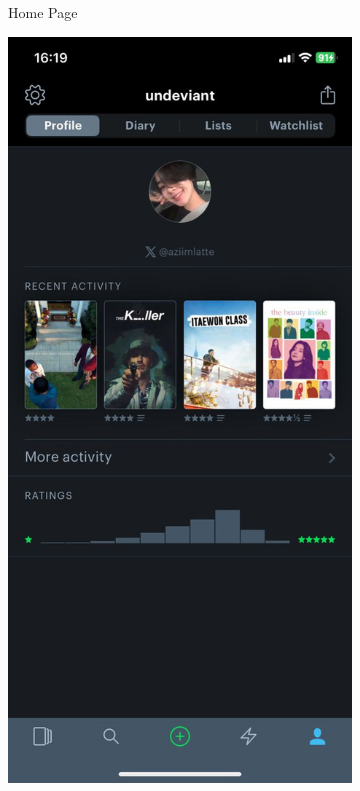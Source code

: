 \begin{figure} [h]
\begin{subfigure}{.3\linewidth}
      \caption{Home Page}
      \label{fig:myfig14}
    \end{subfigure}%
    \hspace{1em}%
    \begin{subfigure}{.3\linewidth}
      \centering
      \includegraphics[width = \linewidth]{mainmatter/images/letterboxd2.jpg}

\end{subfigure}
\end{figure}
